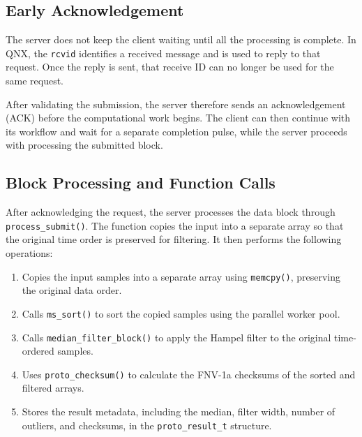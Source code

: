 \documentclass[12pt,a4paper,oneside]{report}
\begin{document}
\subsection{Early Acknowledgement}

The server does not keep the client waiting until all the processing is complete. In QNX, the \texttt{rcvid} identifies a received message and is used to reply to that request. Once the reply is sent, that receive ID can no longer be used for the same request.

After validating the submission, the server therefore sends an acknowledgement (ACK) before the computational work begins. The client can then continue with its workflow and wait for a separate completion pulse, while the server proceeds with processing the submitted block.

\subsection{Block Processing and Function Calls}

After acknowledging the request, the server processes the data block through \texttt{process\_submit()}. The function copies the input into a separate array so that the original time order is preserved for filtering. It then performs the following operations:

\begin{enumerate}
    \item Copies the input samples into a separate array using \texttt{memcpy()}, preserving the original data order.
    \item Calls \texttt{ms\_sort()} to sort the copied samples using the parallel worker pool.
    \item Calls \texttt{median\_filter\_block()} to apply the Hampel filter to the original time-ordered samples.
    \item Uses \texttt{proto\_checksum()} to calculate the FNV-1a checksums of the sorted and filtered arrays.
    \item Stores the result metadata, including the median, filter width, number of outliers, and checksums, in the \texttt{proto\_result\_t} structure.
\end{enumerate}
\end{document}
